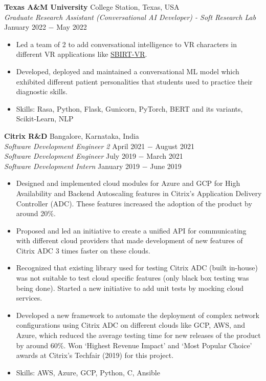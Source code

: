\documentclass{article}
\begin{document}
\noindent \textbf{Texas A\&M University} \hfill College Station, Texas, USA\\
\textit{Graduate Research Assistant (Conversational AI Developer) - Soft Research Lab} \hfill January 2022 $-$ May 2022
\begin{itemize}[noitemsep,nolistsep,leftmargin=*]
\item {Led a team of 2 to add conversational intelligence to VR characters in different VR applications like \href{https://softinteraction.com/portfolio/sbirt-vr}{\underline{SBIRT-VR}}}.
\item {Developed, deployed and maintained a conversational ML model which exhibited different patient personalities that students used to practice their diagnostic skills.}
\item Skills: Rasa, Python, Flask, Gunicorn, PyTorch, BERT and its variants, Scikit-Learn, NLP\\

\end{itemize}
\noindent \textbf{Citrix R\&D} \hfill Bangalore, Karnataka, India \\
\textit{Software Development Engineer 2} \hfill April 2021 $-$ August 2021 \\
\textit{Software Development Engineer} \hfill July 2019 $-$ March 2021 \\
\textit{Software Development Intern} \hfill January 2019 $-$ June 2019
\begin{itemize}[noitemsep,nolistsep,leftmargin=*]
\item {Designed and implemented cloud modules for Azure and GCP for High Availability and Backend Autoscaling features in Citrix's Application Delivery Controller (ADC). These features increased the adoption of the product by around 20\%.}
\item {Proposed and led an initiative to create a unified API for communicating with different cloud providers that made development of new features of Citrix ADC 3 times faster on these clouds.}
\item {Recognized that existing library used for testing Citrix ADC (built in-house) was not suitable to test cloud specific features (only black box testing was being done). Started a new initiative to add unit tests by mocking cloud services.}
\item {Developed a new framework to automate the deployment of complex network configurations using Citrix ADC on different clouds like GCP, AWS, and Azure, which reduced the average testing time for new releases of the product by around 60\%. Won `Highest Revenue Impact' and `Most Popular Choice' awards at Citrix's Techfair (2019) for this project.}
\item {Skills: AWS, Azure, GCP, Python, C, Ansible\\}
\end{itemize}
\end{document}
